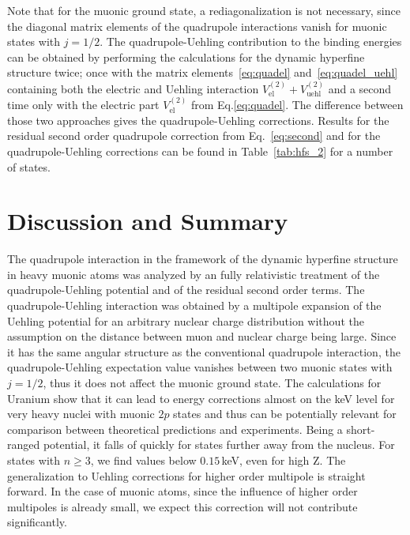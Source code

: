Note that for the muonic ground state, a rediagonalization is not necessary, since the diagonal matrix elements of the quadrupole interactions vanish for muonic states with $j=1/2$.
The quadrupole-Uehling contribution to the binding energies can be obtained by performing the calculations for the dynamic hyperfine structure twice; once with the matrix elements~\eqref{eq:quadel} and~\eqref{eq:quadel_uehl} containing both the electric and Uehling interaction ${V_{\text{el}}^{(2)}}{+}{V_{\text{uehl}}^{(2)}}$ and a second time only with the electric part ${V_{\text{el}}^{(2)}}$ from Eq.\eqref{eq:quadel}. The difference between those two approaches gives the quadrupole-Uehling corrections. Results for the residual second order quadrupole correction from Eq.~\eqref{eq:second} and for the quadrupole-Uehling corrections can be found in Table~\ref{tab:hfs_2} for a number of states.
\section{Discussion and Summary}
The quadrupole interaction in the framework of the dynamic hyperfine structure in heavy muonic atoms was analyzed by an fully relativistic treatment of the quadrupole-Uehling potential and of the residual second order terms.
The quadrupole-Uehling interaction was obtained by a multipole expansion of the Uehling potential for an arbitrary nuclear charge distribution without the assumption on the distance between muon and nuclear charge being large.
Since it has the same angular structure as the conventional quadrupole interaction, the quadrupole-Uehling expectation value vanishes between two muonic states with $j=1/2$, thus it does not affect the muonic ground state.
The calculations for Uranium show that it can lead to energy corrections almost on the keV level for very heavy nuclei with muonic $2p$ states and thus can be potentially relevant for comparison between theoretical predictions and experiments. Being a short-ranged potential, it falls of quickly for states further away from the nucleus. For states with $n\geq3$, we find values below $0.15\,$keV, even for high Z.
The generalization to Uehling corrections for higher order multipole is straight forward. In the case of muonic atoms, since the influence of higher order multipoles is already small, we expect this correction will not contribute significantly.


